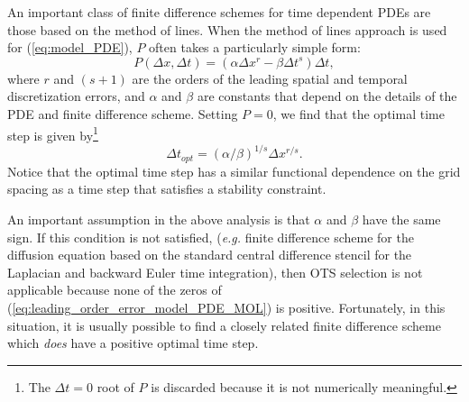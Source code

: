 \documentclass[fleqn,12pt,twoside]{article}
\newcommand{\beq}{\begin{equation}}
\newcommand{\eeq}{\end{equation}}
\def\dt{\Delta t}
\def\dx{\Delta x}
\def\dto{\dt_{opt}}
\def\eg{\emph{e.g. }}
\begin{document}
An important class of finite difference schemes for time dependent PDEs are 
those based on the method of lines.   When the method of lines approach is 
used for (\ref{eq:model_PDE}), $P$ often takes a particularly simple 
form:
\beq
  P(\dx, \dt) = (\alpha \dx^r - \beta \dt^s) \dt,
  \label{eq:leading_order_error_model_PDE_MOL}
\eeq
where $r$ and $(s+1)$ are the orders of the leading spatial and temporal 
discretization errors, and $\alpha$ and $\beta$ are constants that 
depend on the details of the PDE and finite difference scheme.  Setting 
$P = 0$, we find that the optimal time step is given by\footnote{The $\dt = 0$ 
root of $P$ is discarded because it is not numerically meaningful.}
\beq
  \dto = \left(\alpha/\beta \right)^{1/s} \dx^{r/s}.
  \label{eq:optimal_time_step}
\eeq
Notice that the optimal time step has a similar functional dependence on the 
grid spacing as a time step that satisfies a stability constraint.  

An important assumption in the above analysis is that $\alpha$ and $\beta$ 
have the same sign.  If this condition is not satisfied, (\eg finite
difference scheme for the diffusion equation based on the standard central
difference stencil for the Laplacian and backward Euler time integration),
then OTS selection is not applicable because none of the zeros of 
(\ref{eq:leading_order_error_model_PDE_MOL}) is positive.  Fortunately, 
in this situation, it is usually possible to find a closely related finite 
difference scheme which \emph{does} have a positive optimal time step.
\end{document}
